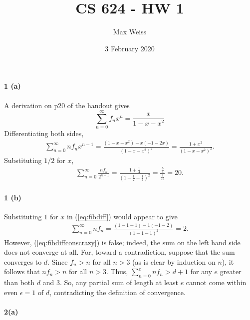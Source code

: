 \documentclass[
]{article}
\date{3 February 2020}
\title{CS 624 - HW 1}
\author{Max Weiss}
\begin{document}
\maketitle

\hypertarget{a}{%
\paragraph{1 (a)}\label{a}}

A derivation on p20 of the handout gives \begin{equation*}
  \label{eq:fib}
  \sum_{n=0}^{\infty}f_nx^n = \frac{x}{1-x-x^2}
\end{equation*} Differentiating both sides, 
\begin{align}
  \label{eq:fibdiff}
  \sum_{n=0}^{\infty}nf_nx^{n-1} = \frac{(1-x-x^2) - x(-1-2x)}{(1-x-x^2)^2}
  = \frac{1 + x^2}{(1-x-x^2)^2}.
\end{align} Substituting \(1/2\) for \(x\), \begin{align*}
  \sum_{n=0}^{\infty}\frac{nf_n}{2^{n-1}}
  = \frac{1 + \frac{1}{4}}{(1-\frac{1}{2}-\frac{1}{4})^2}
  = \frac{\frac{5}{4}}{\frac{1}{16}}
    = 20.
\end{align*}

\hypertarget{b}{%
\paragraph{1 (b)}\label{b}}

Substituting \(1\) for \(x\) in (\ref{eq:fibdiff}) would appear to give
\begin{align}
  \label{eq:fibdiffconscrazy}
  \sum_{n=0}^{\infty}nf_n = \frac{(1-1-1) - 1(-1-2)}{(1-1-1)^2} = 2.
\end{align} However, (\ref{eq:fibdiffconscrazy}) is false; indeed, the
sum on the left hand side does not converge at all. For, toward a
contradiction, suppose that the sum converges to \(d\). Since \(f_n>n\)
for all \(n>3\) (as is clear by induction on \(n\)), it follows that
\(nf_n>n\) for all \(n>3\). Thus, \(\sum_{n=0}^{e}nf_n > d+1\) for any
\(e\) greater than both \(d\) and \(3\). So, any partial sum of length
at least \(e\) cannot come within even \(\epsilon=1\) of \(d\),
contradicting the definition of convergence.

\hypertarget{a-1}{%
\paragraph{2(a)}\label{a-1}}
\end{document}
